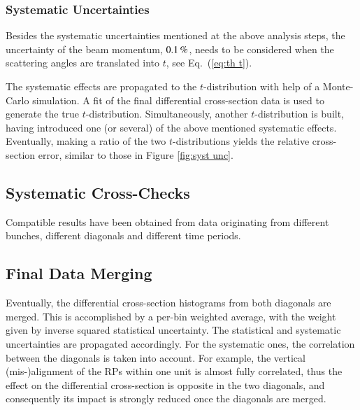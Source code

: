 
\subsubsection{Systematic Uncertainties}
\label{sec:systematics}

Besides the systematic uncertainties mentioned at the above analysis steps, the uncertainty of the beam momentum, $0.1\,{\rm \%}$, needs to be considered when the scattering angles are translated into $t$, see Eq.~(\ref{eq:th t}).

The systematic effects are propagated to the $t$-distribution with help of a Monte-Carlo simulation. A fit of the final differential cross-section data is used to generate the true $t$-distribution. Simultaneously, another $t$-distribution is built, having introduced one (or several) of the above mentioned systematic effects. Eventually, making a ratio of the two $t$-distributions yields the relative cross-section error, similar to those in Figure \ref{fig:syst unc}.



\subsection{Systematic Cross-Checks}
\label{sec:cross checks}

Compatible results have been obtained from data originating from different bunches, different diagonals and different time periods.


\subsection{Final Data Merging}
\label{sec:final data merging}

Eventually, the differential cross-section histograms from both diagonals are merged. This is accomplished by a per-bin weighted average, with the weight given by inverse squared statistical uncertainty. The statistical and systematic uncertainties are propagated accordingly. For the systematic ones, the correlation between the diagonals is taken into account. For example, the vertical (mis-)alignment of the RPs within one unit is almost fully correlated, thus the effect on the differential cross-section is opposite in the two diagonals, and consequently its impact is strongly reduced once the diagonals are merged.

